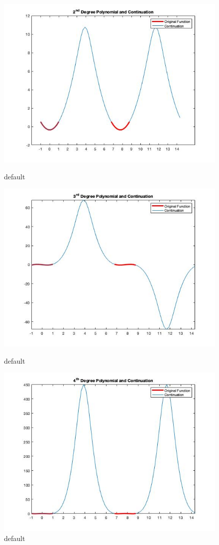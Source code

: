 \documentclass[11pt]{amsart}
\begin{document}
\begin{figure}[htbp]
\begin{center}
\includegraphics[scale=0.5]{SecondDegreeContinuation.jpg}
\caption{default}
\label{default}



\includegraphics[scale=0.5]{ThirdDegreeContinuation.jpg}
\caption{default}
\label{default}



\includegraphics[scale=0.5]{FourthDegreeContinuation.jpg}
\caption{default}
\label{default}


\end{center}
\end{figure}
\end{document}
